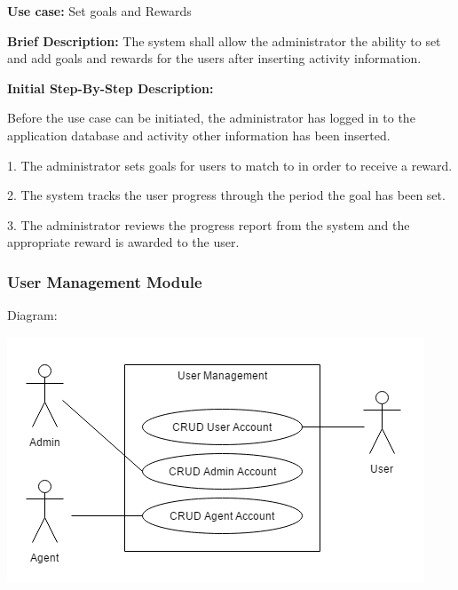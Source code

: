 ﻿\documentclass{article}
\begin{document}
\begin{flushleft}
    \textbf{Use case:} Set goals and Rewards  
    \newline
    	
    \textbf{Brief Description:}
    \newline
    The system shall allow the administrator the ability to set and add goals and rewards for the users after inserting activity information. 
    \newline
    
    \textbf{Initial Step-By-Step Description:}
    
    Before the use case can be initiated, the administrator has logged in to the application database and activity other information has been inserted.
	\newline    

1. The administrator sets goals for users to match to in order to receive a reward.

2. The system tracks the user progress through the period the goal has been set.

3. The administrator reviews the progress report from the system and the appropriate reward is awarded to the user.


\end{flushleft}

\subsubsection{User Management Module}
    Diagram:
    
    \includegraphics[scale=.7]{UserManagement} 
    
\end{document}
